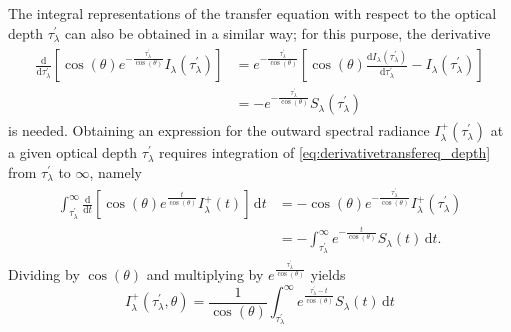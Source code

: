 \documentclass[a4paper,12pt]{report}
\begin{document}
The integral representations of the transfer equation with respect to the optical depth $\tau^\prime_\lambda$ can also be obtained in a similar way; for this purpose, the derivative \begin{align}\begin{aligned}\label{eq:derivativetransfereq_depth}
\frac{\mathrm{d}}{\mathrm{d}\tau^\prime_\lambda}\left[\cos(\theta)e^{-\frac{\tau^\prime_\lambda}{\cos(\theta)}}I_\lambda(\tau^\prime_\lambda)\right] &= e^{-\frac{\tau^\prime_\lambda}{\cos(\theta)}}\left[\cos(\theta)\frac{\mathrm{d}I_\lambda(\tau^\prime_\lambda)}{\mathrm{d}\tau^\prime_\lambda}-I_\lambda(\tau^\prime_\lambda)\right] \\ &= -e^{-\frac{\tau^\prime_\lambda}{\cos(\theta)}}S_\lambda(\tau^\prime_\lambda)
\end{aligned}\end{align} is needed. Obtaining an expression for the outward spectral radiance $I^+_\lambda(\tau_\lambda^\prime)$ at a given optical depth $\tau^\prime_\lambda$ requires integration of \cref{eq:derivativetransfereq_depth} from $\tau_\lambda^\prime$ to $\infty$, namely \begin{align}\begin{aligned}
\int_{\tau_\lambda^\prime}^{\infty} \frac{\mathrm{d}}{\mathrm{d}t}\left[\cos(\theta)e^{\frac{t}{\cos(\theta)}}I^+_\lambda(t)\right]\,\mathrm{d}t &= -\cos(\theta)e^{-\frac{\tau_\lambda^\prime}{\cos(\theta)}}I_\lambda^+(\tau_\lambda^\prime) \\ &= -\int_{\tau^\prime_\lambda}^{\infty} e^{-\frac{t}{\cos(\theta)}}S_\lambda(t)\,\mathrm{d}t.
\end{aligned}\end{align} Dividing by $\cos(\theta)$ and multiplying by $e^{\frac{\tau_\lambda^\prime}{\cos(\theta)}}$ yields 
\begin{equation}\label{eq:formaltransferequationoutward_depth}
I^+_\lambda(\tau^\prime_\lambda, \theta) = \frac{1}{\cos(\theta)}\int_{\tau^\prime_\lambda}^{\infty} e^{\frac{\tau_\lambda^\prime - t}{\cos(\theta)}}S_\lambda(t)\,\mathrm{d}t
\end{equation}
\end{document}
